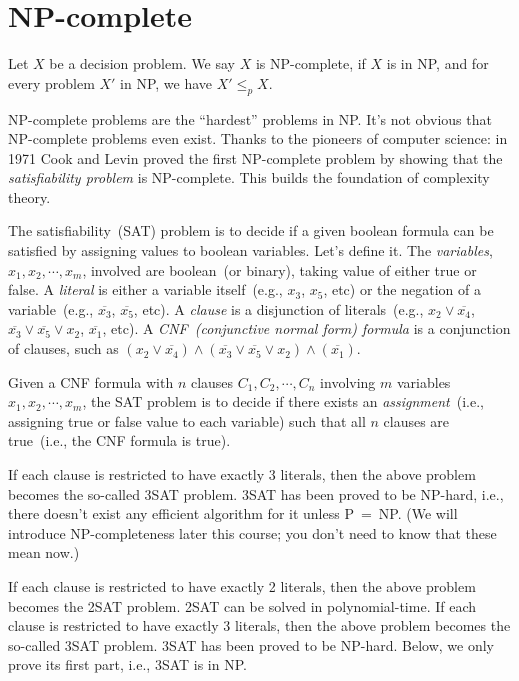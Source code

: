 \setcounter{definition}{0} \setcounter{property}{0} \setcounter{claim}{0} \setcounter{fact}{0} \setcounter{corollary}{0} \setcounter{figure}{0}
\section{NP-complete}

\begin{definition}[NP-complete]
Let $X$ be a decision problem. We say $X$ is NP-complete, if $X$ is in NP, and for every problem $X'$ in NP, we have $X'\le_p X$.
\end{definition}

NP-complete problems are the ``hardest'' problems in NP. It's not obvious that
NP-complete problems even exist.
Thanks to the pioneers of computer science: in 1971 Cook and Levin proved the first
NP-complete problem by showing that the \emph{satisfiability problem} is NP-complete.
This builds the foundation of complexity theory.

The satisfiability~(SAT) problem is
to decide if a given boolean formula can be satisfied
by assigning values to boolean variables.
Let's define it. The \emph{variables}, $x_1, x_2, \cdots, x_m$, involved are
boolean~(or binary), taking value of either true or false.
A \emph{literal} is either a variable itself~(e.g., $x_3$, $x_5$, etc) or the negation of a variable~(e.g., $\overline{x_3}$, $\overline{x_5}$, etc).
A \emph{clause} is a disjunction of literals~(e.g., $x_2 \vee \overline{x_4}$, $\overline{x_3} \vee \overline{x_5} \vee x_2$, $\overline{x_1}$, etc).
A \emph{CNF~(conjunctive normal form) formula} is a conjunction of clauses, such as
$(x_2 \vee \overline{x_4})\wedge (\overline{x_3} \vee \overline{x_5} \vee x_2) \wedge (\overline{x_1})$.

Given a CNF formula with $n$ clauses $C_1, C_2, \cdots, C_n$ involving $m$ variables
$x_1, x_2, \cdots, x_m$, the SAT problem is to decide if there exists an
\emph{assignment}~(i.e., assigning true or false value to each variable) such
that all $n$ clauses are true~(i.e., the CNF formula is true).

If each clause is restricted to have exactly 3 literals, then the above problem becomes the so-called 3SAT problem.
3SAT has been proved to be NP-hard, i.e., there doesn't exist any efficient algorithm for it unless P~=~NP.
(We will introduce NP-completeness later this course; you don't need to know that these mean now.)

If each clause is restricted to have exactly 2 literals, then the above problem becomes the 2SAT problem.
2SAT can be solved in polynomial-time.
If each clause is restricted to have exactly 3 literals, then the above problem becomes the so-called 3SAT problem.
3SAT has been proved to be NP-hard.
Below, we only prove its first part, i.e., 3SAT is in NP.


